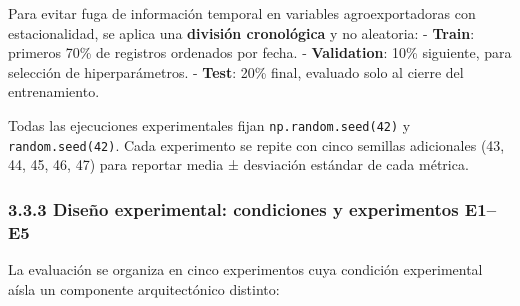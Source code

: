 Para evitar fuga de información temporal en variables agroexportadoras
con estacionalidad, se aplica una \textbf{división cronológica} y no
aleatoria: - \textbf{Train}: primeros 70\% de registros ordenados por
fecha. - \textbf{Validation}: 10\% siguiente, para selección de
hiperparámetros. - \textbf{Test}: 20\% final, evaluado solo al cierre
del entrenamiento.

Todas las ejecuciones experimentales fijan \texttt{np.random.seed(42)} y
\texttt{random.seed(42)}. Cada experimento se repite con cinco semillas
adicionales (43, 44, 45, 46, 47) para reportar media ± desviación
estándar de cada métrica.

\subsubsection{3.3.3 Diseño experimental: condiciones y experimentos
E1--E5}\label{diseuxf1o-experimental-condiciones-y-experimentos-e1e5}

La evaluación se organiza en cinco experimentos cuya condición
experimental aísla un componente arquitectónico distinto:

